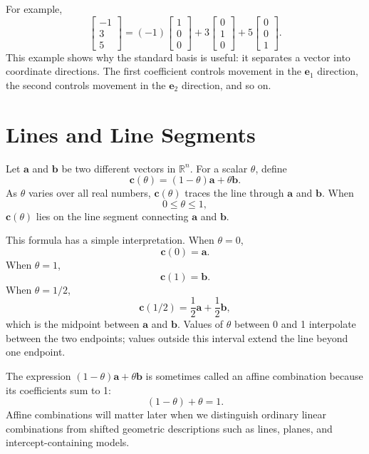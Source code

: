 For example,
\[
\begin{bmatrix}-1\\3\\5\end{bmatrix}
=
(-1)\begin{bmatrix}1\\0\\0\end{bmatrix}
+3\begin{bmatrix}0\\1\\0\end{bmatrix}
+5\begin{bmatrix}0\\0\\1\end{bmatrix}.
\]
This example shows why the standard basis is useful: it separates a vector into coordinate directions. The first coefficient controls movement in the \(\mathbf{e}_1\) direction, the second controls movement in the \(\mathbf{e}_2\) direction, and so on.

\section{Lines and Line Segments}
\label{mf:affine-combinations}
\label{mf:line-segments}

Let \(\mathbf{a}\) and \(\mathbf{b}\) be two different vectors in \(\mathbb{R}^n\). For a scalar \(\theta\), define
\[
\mathbf{c}(\theta)=(1-\theta)\mathbf{a}+\theta\mathbf{b}.
\]
As \(\theta\) varies over all real numbers, \(\mathbf{c}(\theta)\) traces the line through \(\mathbf{a}\) and \(\mathbf{b}\). When
\[
0\leq \theta\leq 1,
\]
\(\mathbf{c}(\theta)\) lies on the line segment connecting \(\mathbf{a}\) and \(\mathbf{b}\).

This formula has a simple interpretation. When \(\theta=0\),
\[
\mathbf{c}(0)=\mathbf{a}.
\]
When \(\theta=1\),
\[
\mathbf{c}(1)=\mathbf{b}.
\]
When \(\theta=1/2\),
\[
\mathbf{c}(1/2)=\frac12\mathbf{a}+\frac12\mathbf{b},
\]
which is the midpoint between \(\mathbf{a}\) and \(\mathbf{b}\). Values of \(\theta\) between 0 and 1 interpolate between the two endpoints; values outside this interval extend the line beyond one endpoint.

The expression \((1-\theta)\mathbf{a}+\theta\mathbf{b}\) is sometimes called an affine combination because its coefficients sum to 1:
\[
(1-\theta)+\theta=1.
\]
Affine combinations will matter later when we distinguish ordinary linear combinations from shifted geometric descriptions such as lines, planes, and intercept-containing models.

